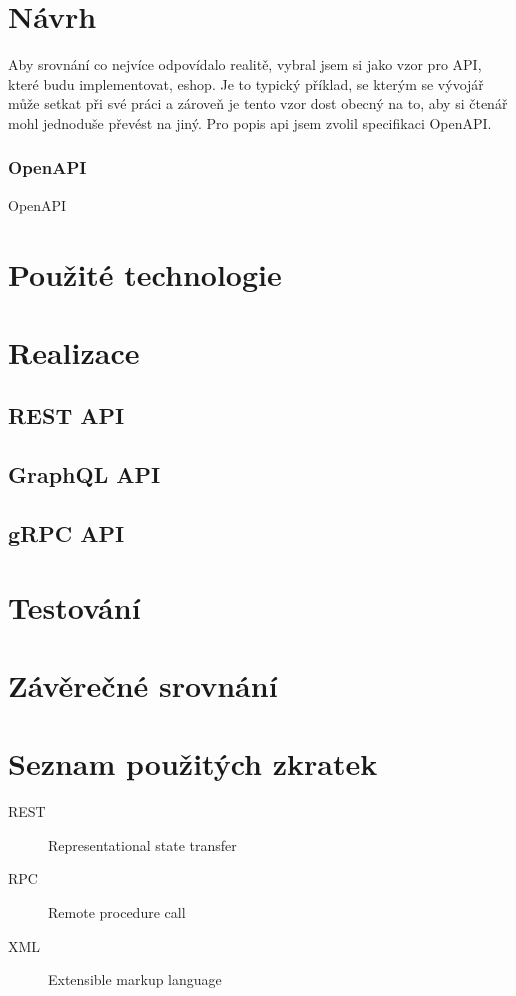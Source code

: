\documentclass[thesis=M,czech]{FITthesis}[2019/12/23]
\begin{document}
\chapter{Návrh}
Aby srovnání co nejvíce odpovídalo realitě, vybral jsem si jako vzor pro API, které budu implementovat, eshop. Je to typický příklad, se kterým se vývojář může setkat při své práci a zároveň je tento vzor dost obecný na to, aby si čtenář mohl jednoduše převést na jiný. Pro popis api jsem zvolil specifikaci OpenAPI.

\subsection{OpenAPI}
OpenAPI 

\chapter{Použité technologie}

\chapter{Realizace}
\section{REST API}
\section{GraphQL API}
\section{gRPC API}

\chapter{Testování}

\chapter{Závěrečné srovnání}

\begin{conclusion}
\end{conclusion}




\appendix

\chapter{Seznam použitých zkratek}
\begin{description}
	\item[REST] Representational state transfer
	\item[RPC] Remote procedure call
	\item[XML] Extensible markup language
\end{description} 
\end{document}
